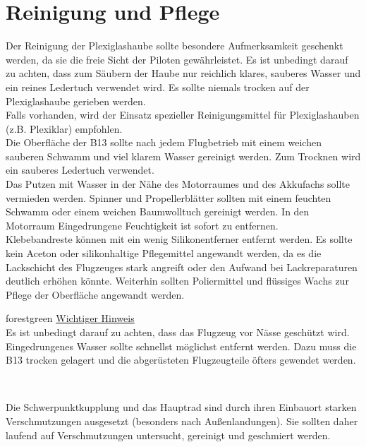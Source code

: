 \section{Reinigung und Pflege}
Der Reinigung der Plexiglashaube sollte besondere Aufmerksamkeit geschenkt werden, da sie die freie Sicht der Piloten gewährleistet. Es ist unbedingt darauf zu achten, dass zum Säubern der Haube nur reichlich klares, sauberes Wasser und ein reines Ledertuch verwendet wird. Es sollte niemals trocken auf der Plexiglashaube gerieben werden. \\
\newline
Falls vorhanden, wird der Einsatz spezieller Reinigungsmittel für Plexiglashauben (z.B. Plexiklar) empfohlen. \\
\newline
Die Oberfläche der B13 sollte nach jedem Flugbetrieb mit einem weichen sauberen Schwamm und viel klarem Wasser gereinigt werden. Zum Trocknen wird ein sauberes Ledertuch verwendet. \\
\newline
Das Putzen mit Wasser in der Nähe des Motorraumes und des Akkufachs sollte vermieden werden. Spinner und Propellerblätter sollten mit einem feuchten Schwamm oder einem weichen Baumwolltuch gereinigt werden.
In den Motorraum Eingedrungene Feuchtigkeit ist sofort zu entfernen.\\
Klebebandreste können mit ein wenig Silikonentferner entfernt werden. Es sollte kein Aceton oder silikonhaltige Pflegemittel angewandt werden, da es die Lackschicht des Flugzeuges stark angreift oder den Aufwand bei Lackreparaturen deutlich erhöhen könnte. Weiterhin sollten Poliermittel und flüssiges Wachs zur Pflege der Oberfläche angewandt werden. \\
\newline
\begin{color}{forestgreen}
\large{\underline{Wichtiger Hinweis}}\\
Es ist unbedingt darauf zu achten, dass das Flugzeug vor Nässe geschützt wird. 	Eingedrungenes Wasser sollte schnellst möglichst entfernt werden. Dazu muss die B13 trocken gelagert und die abgerüsteten Flugzeugteile  öfters gewendet 	werden. 
\end{color}\\
\newline

Die Schwerpunktkupplung und das Hauptrad sind durch ihren Einbauort starken Verschmutzungen ausgesetzt (besonders nach Außenlandungen). Sie sollten daher laufend auf Verschmutzungen untersucht, gereinigt und geschmiert werden. 